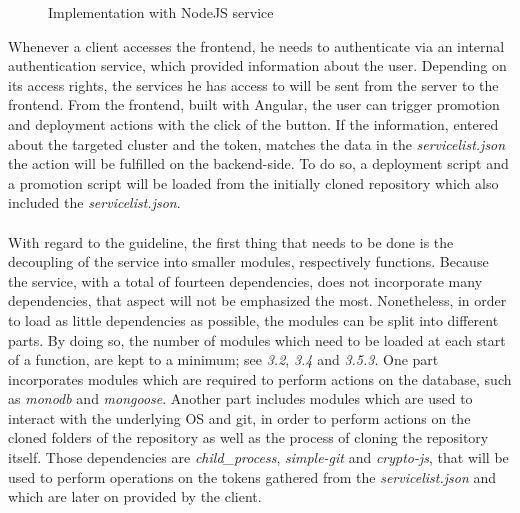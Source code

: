 \documentclass[a4paper,11pt, pagesize]{scrartcl}
\begin{document}
\begin{spacing}{1.2}
\begin{figure}[H]
\caption{Implementation with NodeJS service}
\end{figure}  
Whenever a client accesses the frontend, he needs to authenticate via an internal authentication service, which provided information about the user. Depending on its access rights, the services he has access to will be sent from the server to the frontend. From the frontend, built with Angular, the user can trigger promotion and deployment actions with the click of the button. If the information, entered about the targeted cluster and the token, matches the data in the \textit{servicelist.json} the action will be fulfilled on the backend-side. To do so, a deployment script and a promotion script will be loaded from the initially cloned repository which also included the \textit{servicelist.json}. \\\\With regard to the guideline, the first thing that needs to be done is the decoupling of the service into smaller modules, respectively functions. Because the service, with a total of fourteen dependencies, does not incorporate many dependencies, that aspect will not be emphasized the most. Nonetheless, in order to load as little dependencies as possible, the modules can be split into different parts. By doing so, the number of modules which need to be loaded at each start of a function, are kept to a minimum; see \textit{3.2}, \textit{3.4} and \textit{3.5.3}. One part incorporates modules which are required to perform actions on the database, such as \textit{monodb} and \textit{mongoose}. Another part includes modules which are used to interact with the underlying OS and git, in order to perform actions on the cloned folders of the repository as well as the process of cloning the repository itself. Those dependencies are \textit{child\_process}, \textit{simple-git} and \textit{crypto-js}, that will be used to perform operations on the tokens gathered from the \textit{servicelist.json} and which are later on provided by the client.\\\\

\end{spacing}
\end{document}
